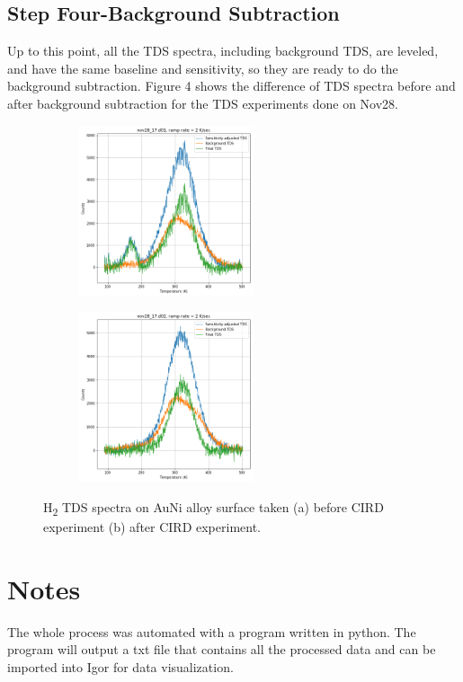 \documentclass{article}
\begin{document}
\subsection{Step Four-Background Subtraction}
Up to this point, all the TDS spectra, including background TDS, are leveled,
and have the same baseline and sensitivity, so they are ready to do the
background subtraction. Figure 4 shows the difference of TDS spectra before and
after background subtraction for the TDS experiments done on Nov28.

\begin{figure}[h]
\begin{subfigure}{0.5\textwidth}
\includegraphics[width=0.9\linewidth,
    height=5cm]{background_subtraction_before.png}
\caption{}
\label{fig:subim4-a}
\end{subfigure}
\begin{subfigure}{0.5\textwidth}
\includegraphics[width=0.9\linewidth,
    height=5cm]{background_subtraction_after.png}
\caption{}
\label{fig:subim4-b}
\end{subfigure}
    \caption{H\textsubscript{2} TDS spectra on AuNi alloy surface taken (a)
    before CIRD experiment (b) after CIRD experiment.}
\label{fig:image3}
\end{figure}

\section{Notes}
The whole process was automated with a program written in python. The program
will output a txt file that contains all the processed data and can be imported
into Igor for data visualization.
\end{document}
